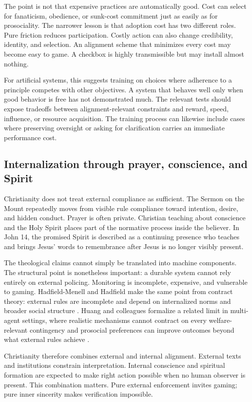 \documentclass[11pt]{article}
\begin{document}
The point is not that expensive practices are automatically good. Cost can select for fanaticism, obedience, or sunk-cost commitment just as easily as for prosociality. The narrower lesson is that adoption cost has two different roles. Pure friction reduces participation. Costly action can also change credibility, identity, and selection. An alignment scheme that minimizes every cost may become easy to game. A checkbox is highly transmissible but may install almost nothing.

For artificial systems, this suggests training on choices where adherence to a principle competes with other objectives. A system that behaves well only when good behavior is free has not demonstrated much. The relevant tests should expose tradeoffs between alignment-relevant constraints and reward, speed, influence, or resource acquisition. The training process can likewise include cases where preserving oversight or asking for clarification carries an immediate performance cost.

\subsection{Internalization through prayer, conscience, and Spirit}

Christianity does not treat external compliance as sufficient. The Sermon on the Mount repeatedly moves from visible rule compliance toward intention, desire, and hidden conduct. Prayer is often private. Christian teaching about conscience and the Holy Spirit places part of the normative process inside the believer. In John 14, the promised Spirit is described as a continuing presence who teaches and brings Jesus' words to remembrance after Jesus is no longer visibly present.

The theological claims cannot simply be translated into machine components. The structural point is nonetheless important: a durable system cannot rely entirely on external policing. Monitoring is incomplete, expensive, and vulnerable to gaming. Hadfield-Menell and Hadfield make the same point from contract theory: external rules are incomplete and depend on internalized norms and broader social structure \parencite{hadfieldmenell2019incomplete}. Huang and colleagues formalize a related limit in multi-agent settings, where realistic mechanisms cannot contract on every welfare-relevant contingency and prosocial preferences can improve outcomes beyond what external rules achieve \parencite{huang2026mechanism}.

Christianity therefore combines external and internal alignment. External texts and institutions constrain interpretation. Internal conscience and spiritual formation are expected to make right action possible when no human observer is present. This combination matters. Pure external enforcement invites gaming; pure inner sincerity makes verification impossible.
\end{document}
